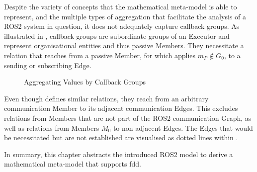    Despite the variety of concepts that the mathematical meta-model is able to represent, and the multiple types of aggregation that facilitate the analysis of a ROS2 system in question, it does not adequately capture callback groups.
    As illustrated in , callback groups are subordinate groups of an Executor and represent organisational entities and thus passive Members. They necessitate a relation that reaches from a passive Member, for which applies $m_P\notin G_0$, to a sending or subscribing Edge.
    \begin{figure}[h]
        \centering
        
        \caption[Aggregating Values by Callback Groups]{Aggregating Values by Callback Groups \legendadapted} \label{fig:tikz:mathModel:callbackgroups}
    \end{figure}\enlargethispage{1\baselineskip}
    Even though  defines similar relations, they reach from an arbitrary communication Member to its adjacent communication Edges. This excludes relations from Members that are not part of the ROS2 communication Graph, as well as relations from Members $M_0$ to non-adjacent Edges. The Edges that would be necessitated but are not established are visualised as dotted lines within .

In summary, this chapter abstracts the introduced ROS2 model to derive a mathematical meta-model that supports \acl{fdd}.